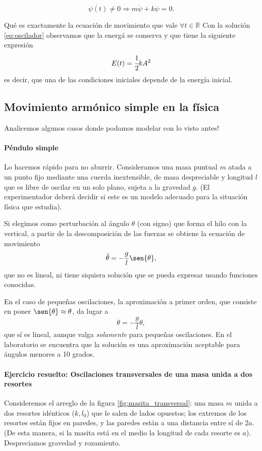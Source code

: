 \documentclass[a4paper,spanish]{article}
\def\R {\mathbb{R}}
\numberwithin{equation}{section}
\begin{document}
\begin{center}
\[\dot{\psi(t)}\neq 0 \Longrightarrow m\ddot{\psi}+k \psi=0. \]
\end{center}

Qu\'e es exactamente la ecuaci\'on de movimiento que vale $\forall
t \in \R$ Con la soluci\'on \ref{eq:oscilador} observamos
que la energ\'a se conserva y que tiene la siguiente expresi\'on
    \begin{equation}
        E(t) = \cfrac{1}{2} k A^2
        \label{eq:oscilador_energia_tiempo}
    \end{equation}
    es decir, que una de las condiciones iniciales depende de la energ\'ia inicial.

\subsection{Movimiento arm\'onico simple en la f\'isica}
Analicemos algunos casos donde podamos modelar con lo visto antes!

\paragraph{P\'endulo simple} Lo hacemos r\'apido para no aburrir. Consideramos una masa puntual $m$ atada a un punto fijo mediante una cuerda inextensible, de masa despreciable y longitud $l$ que es libre de oscilar en un solo plano, sujeta a la gravedad $g$. (El experimentador deber\'a decidir si este es un modelo adecuado para la situaci\'on f\'isica que estudia).

Si elegimos como perturbaci\'on al \'angulo $\theta$ (con signo) que forma el hilo con la vertical, a partir de la descomposici\'on de las fuerzas se obtiene la ecuaci\'on de movimiento
		\[
			\ddot{\theta}=-\frac{g}{l}\sen{\theta},
		\]
que no es lineal, ni tiene siquiera soluci\'on que se pueda expresar usando funciones conocidas.

En el caso de peque\~nas oscilaciones, la aproximaci\'on a primer orden, que consiste en poner $\sen{\theta}\approx\theta$, da lugar a
		\[
			\ddot{\theta}=-\frac{g}{l}\theta,
		\]
que s\'i es lineal, aunque valga \textit{solamente} para peque\~nas oscilaciones. En el laboratorio se encuentra que la soluci\'on es una aproximaci\'on aceptable para \'angulos menores a 10 grados.

\paragraph{Ejercicio resuelto: Oscilaciones transversales de una masa unida a dos resortes} Consideremos el arreglo de la figura \ref{fig:masita_transversal}: una masa $m$ unida a dos resortes idénticos ($k,l_0$) que le salen de lados opuestos; los extremos de los resortes están fijos en paredes, y las paredes están a una distancia entre sí de $2a$. (De esta manera, si la masita está en el medio la longitud de cada resorte es $a$). Despreciamos gravedad y rozamiento.
\end{document}
